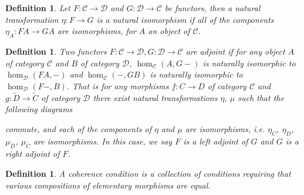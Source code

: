 \documentclass[11pt]{report}
\newcommand{\mcC}{\mathcal{C}}
\newcommand{\mcD}{\mathcal{D}}
\newtheorem{defn}[thm]{Definition} %
\begin{document}
\begin{defn}
Let $F: \mcC \to \mcD$ and $G: \mcD \to \mcC$ be functors, then a natural transformation $\eta: F \to G$ is a natural isomorphism if all of the components $\eta_A:FA \to GA$ are isomorphisms, for $A$ an object of $\mcC$.
\end{defn}


\begin{defn}
  Two functors $F: \mcC \to \mcD, G: \mcD \to \mcC$ are adjoint if for any object $A$ of category $\mcC$ and $B$ of category $\mcD$,
  $\hom_{\mcC}(A,G-)$ is naturally isomorphic to $\hom_{\mcD}(FA,-)$ and $\hom_{\mcC}(-,GB)$ is naturally isomorphic to  $\hom_{\mcD}(F-,B)$.
  That is for any morphisms $f:C \to D$ of category $\mcC$ and $g: \widetilde{D} \to \widetilde{C}$ of category $\mcD$ there exist natural transformations $\eta$, $\mu$ such that the following diagrams
  \begin{center}
  \end{center}
  \begin{center}
\end{center}
  commute, and each of the components of $\eta$ and $\mu$ are isomorphisms, i.e. $\eta_C$, $\eta_D$, $\mu_{\widetilde{D}}$, $\mu_{\widetilde{C}}$ are isomorphisms. In this case, we say $F$ is a left adjoint of $G$ and $G$ is a right adjoint of $F$.
\end{defn}
\begin{defn}
  A coherence condition is a collection of conditions requiring that various compositions of elementary morphisms are equal. 
\end{defn}
\end{document}
